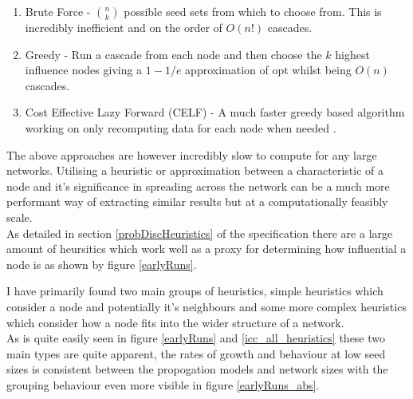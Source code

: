 \documentclass{article}
\begin{document}
\begin{enumerate}
	\item Brute Force - $n \choose k$ possible seed sets from which to choose from. This is incredibly inefficient and on the order of $O(n!)$ cascades.
	\item Greedy - Run a cascade from each node and then choose the $k$ highest influence nodes \cite{kempe2005influential} giving a $1- 1/e$ approximation of opt whilst being $O(n)$ cascades.
	\item Cost Effective Lazy Forward (CELF) - A much faster greedy based algorithm working on only recomputing data for each node when needed \cite{celf}.
\end{enumerate}

The above approaches are however incredibly slow to compute for any large networks.
Utilising a heuristic or approximation between a characteristic of a node and it's significance in spreading across the network can be a much more performant way of extracting similar results but at a computationally feasibly scale.
\\

As detailed in section \ref{probDiscHeuristics} of the specification there are a large amount of heursitics which work well as a proxy for determining how influential a node is as shown by figure \ref{earlyRuns}.

I have primarily found two main groups of heuristics, simple heuristics which consider a node and potentially it's neighbours and some more complex heuristics which consider how a node fits into the wider structure of a network.
\\
As is quite easily seen in figure \ref{earlyRuns} and \ref{icc_all_heuristics} these two main types are quite apparent, the rates of growth and behaviour at low seed sizes is consistent between the propogation models and network sizes with the grouping behaviour even more visible in figure \ref{earlyRuns_abs}.



\newpage
\end{document}
